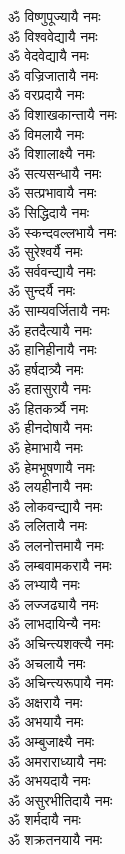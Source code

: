 \begin{flushleft}
\begin{multicols}{2}
ॐ विष्णुपूज्यायै नमः\\
ॐ विश्ववेद्यायै नमः\\
ॐ वेदवेद्यायै नमः\\
ॐ वज्रिजातायै नमः\\
ॐ वरप्रदायै नमः\\
ॐ विशाखकान्तायै नमः\\
ॐ विमलायै नमः\\
ॐ विशालाक्ष्यै नमः\\
ॐ सत्यसन्धायै नमः\\
ॐ सत्प्रभावायै नमः\hfill{}\\
ॐ सिद्धिदायै नमः\\
ॐ स्कन्दवल्लभायै नमः\\
ॐ सुरेश्वर्यै नमः\\
ॐ सर्ववन्द्यायै नमः\\
ॐ सुन्दर्यै नमः\\
ॐ साम्यवर्जितायै नमः\\
ॐ हतदैत्यायै नमः\\
ॐ हानिहीनायै नमः\\
ॐ हर्षदात्र्यै नमः\\
ॐ हतासुरायै नमः\hfill{}\\
ॐ हितकर्त्र्यै नमः\\
ॐ हीनदोषायै नमः\\
ॐ हेमाभायै नमः\\
ॐ हेमभूषणायै नमः\\
ॐ लयहीनायै नमः\\
ॐ लोकवन्द्यायै नमः\\
ॐ ललितायै नमः\\
ॐ ललनोत्तमायै नमः\\
ॐ लम्बवामकरायै नमः\\
ॐ लभ्यायै नमः\hfill{}\\
ॐ लज्जढ्यायै नमः\\
ॐ लाभदायिन्यै नमः\\
ॐ अचिन्त्यशक्त्यै नमः\\
ॐ अचलायै नमः\\
ॐ अचिन्त्यरूपायै नमः\\
ॐ अक्षरायै नमः\\
ॐ अभयायै नमः\\
ॐ अम्बुजाक्ष्यै नमः\\
ॐ अमराराध्यायै नमः\\
ॐ अभयदायै नमः\hfill{}\\
ॐ असुरभीतिदायै नमः\\
ॐ शर्मदायै नमः\\
ॐ शक्रतनयायै नमः\\

\end{multicols}
\end{flushleft}
